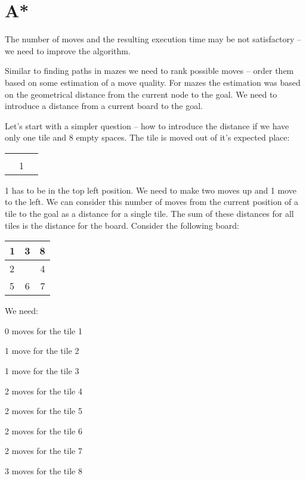 \section{A*}
The number of moves and the resulting execution time
may be not satisfactory -- we need to improve the algorithm.

Similar to finding paths in mazes we need to rank possible moves --
order them based on some estimation of a move quality. For mazes
the estimation was based on the geometrical distance from the
current node to the goal. We need to introduce a distance 
from a current board to the goal.

Let's start with a simpler question -- how to introduce
the distance if we have only one tile and 8 empty spaces.
The tile is moved out of it's expected place:
\begin{center}
\begin{tabular}{ | l | c | r | }
    \hline
      &   &   \\ \hline
      &   &   \\ \hline
      & 1 &   \\
    \hline
  \end{tabular}
\end{center}
1 has to be in the top left position. We need to make two moves up 
and 1 move to the left. We can consider this number of moves from the
current position of a tile to the goal as a distance for a 
single tile. The sum of these distances for all tiles is the distance
for the board. Consider the following board:
 
\begin{center}
\begin{tabular}{ | l | c | r | }
    \hline
    1 & 3 & 8 \\ \hline
    2 &   & 4 \\ \hline
    5 & 6 & 7 \\
    \hline
  \end{tabular}
\end{center}
We need:

0 moves for the tile 1

1 move for the tile 2

1 move for the tile 3

2 moves for the tile 4

2 moves for the tile 5

2 moves for the tile 6

2 moves for the tile 7

3 moves for the tile 8

